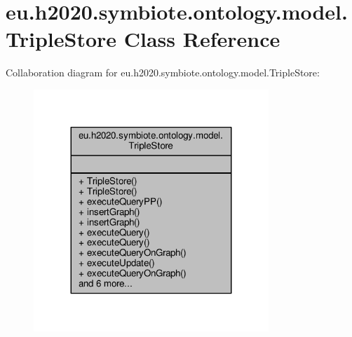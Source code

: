\hypertarget{classeu_1_1h2020_1_1symbiote_1_1ontology_1_1model_1_1TripleStore}{}\section{eu.\+h2020.\+symbiote.\+ontology.\+model.\+Triple\+Store Class Reference}
\label{classeu_1_1h2020_1_1symbiote_1_1ontology_1_1model_1_1TripleStore}


Collaboration diagram for eu.\+h2020.\+symbiote.\+ontology.\+model.\+Triple\+Store\+:
\nopagebreak
\begin{figure}[H]
\begin{center}
\leavevmode
\includegraphics[width=251pt]{classeu_1_1h2020_1_1symbiote_1_1ontology_1_1model_1_1TripleStore__coll__graph}
\end{center}
\end{figure}
